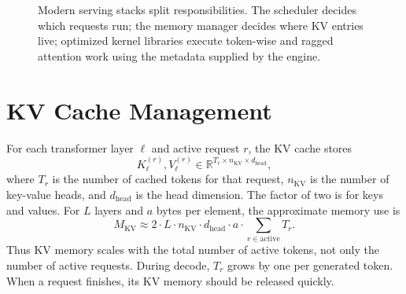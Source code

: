 \documentclass[11pt]{article}
\newcommand{\kv}{\mathrm{KV}}
\begin{document}
\begin{figure}[H]
\centering
{}
\caption{Modern serving stacks split responsibilities.  The scheduler decides which requests run; the memory manager decides where KV entries live; optimized kernel libraries execute token-wise and ragged attention work using the metadata supplied by the engine.}
\label{fig:serving-stack}
\end{figure}

\section{KV Cache Management}

For each transformer layer \(\ell\) and active request \(r\), the KV cache stores
\[
  K_{\ell}^{(r)}, V_{\ell}^{(r)}
  \in \mathbb{R}^{T_r \times n_{\kv} \times d_{\mathrm{head}}},
\]
where \(T_r\) is the number of cached tokens for that request, \(n_{\kv}\) is the number of key-value heads, and \(d_{\mathrm{head}}\) is the head dimension.  The factor of two is for keys and values.  For \(L\) layers and \(a\) bytes per element, the approximate memory use is
\[
  M_{\kv}
  \approx
  2 \cdot L \cdot n_{\kv} \cdot d_{\mathrm{head}} \cdot a
  \cdot
  \sum_{r \in \text{active}} T_r.
\]
Thus KV memory scales with the total number of active tokens, not only the number of active requests.  During decode, \(T_r\) grows by one per generated token.  When a request finishes, its KV memory should be released quickly.
\end{document}
